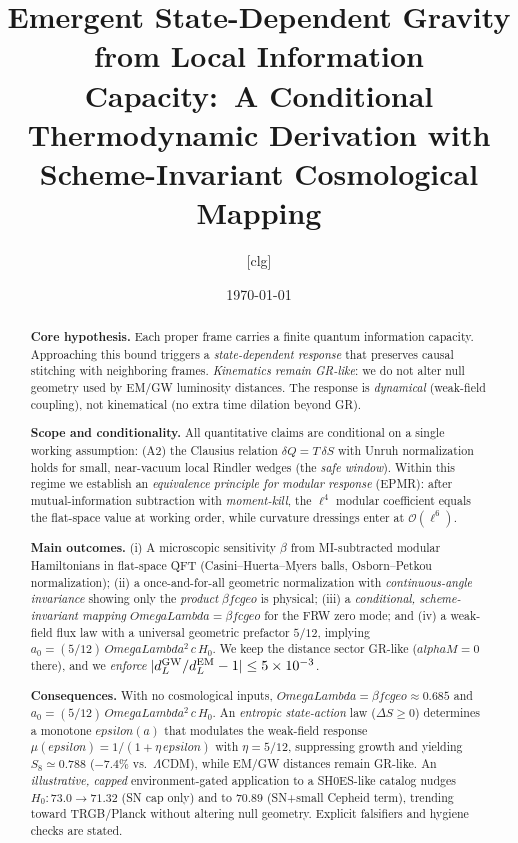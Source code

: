 \documentclass[aps,prd,onecolumn,superscriptaddress,nofootinbib]{revtex4-2}
\def\OmL{OmegaLambda}%
\def\cgeo{cgeo}%
\def\alphaM{alphaM}%
\def\eps{epsilon}%
\newcommand{\OmL}{\Omega_\Lambda}
\newcommand{\cgeo}{c_{\rm geo}}
\newcommand{\alphaM}{\alpha_M}
\newcommand{\eps}{\varepsilon}
\begin{document}
\title{Emergent State-Dependent Gravity from Local Information Capacity:\
A Conditional Thermodynamic Derivation with Scheme-Invariant Cosmological Mapping}

\author{[clg]}
\date{\today}

\begin{abstract}
\textbf{Core hypothesis.} Each proper frame carries a finite quantum information capacity. Approaching this bound triggers a \emph{state-dependent response} that preserves causal stitching with neighboring frames. \emph{Kinematics remain GR-like}: we do not alter null geometry used by EM/GW luminosity distances. The response is \emph{dynamical} (weak-field coupling), not kinematical (no extra time dilation beyond GR).

\textbf{Scope and conditionality.} All quantitative claims are conditional on a single working assumption: (A2) the Clausius relation $\delta Q = T\,\delta S$ with Unruh normalization holds for small, near-vacuum local Rindler wedges (the \emph{safe window}). Within this regime we establish an \emph{equivalence principle for modular response} (EPMR): after mutual-information subtraction with \emph{moment-kill}, the $\ell^4$ modular coefficient equals the flat-space value at working order, while curvature dressings enter at $\mathcal O(\ell^6)$.

\textbf{Main outcomes.} (i) A microscopic sensitivity $\beta$ from MI-subtracted modular Hamiltonians in flat-space QFT (Casini--Huerta--Myers balls, Osborn--Petkou normalization); (ii) a once-and-for-all geometric normalization with \emph{continuous-angle invariance} showing only the \emph{product} $\beta f \cgeo$ is physical; (iii) a \emph{conditional, scheme-invariant mapping} $\OmL=\beta f \cgeo$ for the FRW zero mode; and (iv) a weak-field flux law with a universal geometric prefactor $5/12$, implying $a_0=(5/12)\,\OmL^2\,c\,H_0$. We keep the distance sector GR-like ($\alphaM=0$ there), and we \emph{enforce} $|d_L^{\rm GW}/d_L^{\rm EM}-1|\le 5\times 10^{-3}$.

\textbf{Consequences.} With no cosmological inputs, $\OmL=\beta f \cgeo \approx 0.685$ and $a_0=(5/12)\,\OmL^2\,c\,H_0$. An \emph{entropic state-action} law ($\Delta S\ge 0$) determines a monotone $\eps(a)$ that modulates the weak-field response $\mu(\eps)=1/(1+\eta\,\eps)$ with $\eta=5/12$, suppressing growth and yielding $S_8\simeq 0.788$ ($-7.4\%$ vs.\ $\Lambda$CDM), while EM/GW distances remain GR-like. An \emph{illustrative, capped} environment-gated application to a SH0ES-like catalog nudges $H_0: 73.0\to 71.32$ (SN cap only) and to $70.89$ (SN+small Cepheid term), trending toward TRGB/Planck without altering null geometry. Explicit falsifiers and hygiene checks are stated.
\end{abstract}
\end{document}
